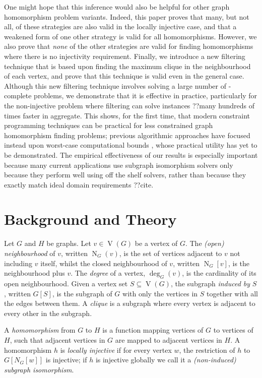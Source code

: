 \documentclass{article}
\newcommand{\neighbourhood}{\operatorname{N}}
\newcommand{\vertexset}{\operatorname{V}}
\newcommand{\degree}{\operatorname{deg}}
\begin{document}
One might hope that this inference would also be helpful for other graph homomorphism problem
variants. Indeed, this paper proves that many, but not all, of these strategies are also valid in
the locally injective case, and that a weakened form of one other strategy is valid for all
homomorphisms. However, we also prove that \emph{none} of the other strategies are valid for finding
homomorphisms where there is no injectivity requirement. Finally, we introduce a new filtering
technique that is based upon finding the maximum clique in the neighbourhood of each vertex, and
prove that this technique is valid even in the general case. Although this new filtering technique
involves solving a large number of \NP-complete problems, we demonstrate that it is effective in
practice, particularly for the non-injective problem where filtering can solve instances ??many
hundreds of times faster in aggregate. This shows, for the first time, that modern constraint
programming techniques can be practical for less constrained graph homomorphism finding problems;
previous algorithmic approaches have focused instead upon worst-case computational bounds
\cite{DBLP:journals/csr/FialaK08,DBLP:journals/ipl/Rzazewski14,DBLP:journals/tcs/ChaplickFHPT15},
whose practical utility has yet to be demonstrated. The empirical effectiveness of our results is
especially important because many current applications use subgraph isomorphism solvers only because
they perform well using off the shelf solvers, rather than because they exactly match ideal domain
requirements ??cite.

\section{Background and Theory}

Let $G$ and $H$ be graphs. Let $v \in \vertexset(G)$ be a vertex of $G$. The \emph{(open)
neighbourhood} of $v$, written $\neighbourhood_G(v)$, is the set of vertices adjacent to $v$ not
including $v$ itself, whilst the closed neighbourhood of $v$, written $\neighbourhood_G[v]$, is the
neighbourhood plus $v$. The \emph{degree} of a vertex, $\degree_G(v)$, is the cardinality of its open
neighbourhood. Given a vertex set $S \subseteq \vertexset(G)$, the subgraph \emph{induced by} $S$,
written $G[S]$, is the subgraph of $G$ with only the vertices in $S$ together with all the edges
between them. A \emph{clique} is a subgraph where every vertex is adjacent to every other in the
subgraph.

A \emph{homomorphism} from $G$ to $H$ is a function mapping vertices of $G$ to vertices of $H$, such
that adjacent vertices in $G$ are mapped to adjacent vertices in $H$. A homomorphism $h$ is
\emph{locally injective} if for every vertex $w$, the restriction of $h$ to $G[N_G[w]]$ is
injective; if $h$ is injective globally we call it a \emph{(non-induced) subgraph isomorphism}.
\end{document}
